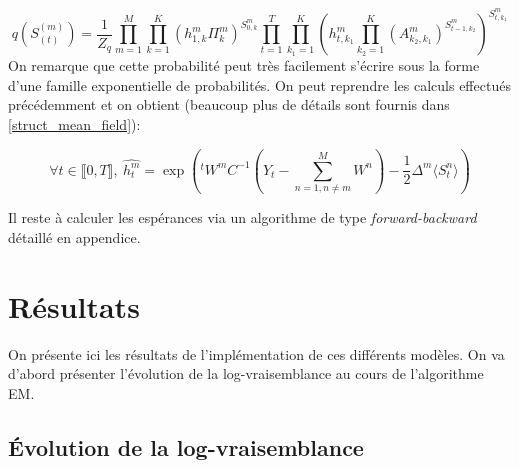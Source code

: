 \documentclass[10pt,a4paper]{article}
\newcommand{\EM}{\textsc{EM}}
\begin{document}
\begin{equation}
  q(S_{(t)}^{(m)}) = \frac{1}{Z_q} \underset{m=1}{\overset{M}{\prod}} 
  \underset{k=1}{\overset{K}{\prod}} \left( h_{1,k}^m \Pi_k^m \right)^{S_{0,k}^m} 
  \underset{t=1}{\overset{T}{\prod}} \underset{k_1=1}{\overset{K}{\prod}} 
  \left(h_{t,k_1}^m \underset{k_2=1}{\overset{K}{\prod}} \left( 
  A_{k_2,k_1}^m\right)^{S_{t-1,k_2}^m} \right)^{S_{t,k_1}^m}
\end{equation}
On remarque que cette probabilité peut très facilement s'écrire sous la forme 
d'une famille exponentielle de probabilités.
On peut reprendre les calculs effectués précédemment et on obtient (beaucoup plus de détails sont fournis dans \ref{struct_mean_field}):

\begin{equation}
\forall t \in \llbracket 0,T \rrbracket, \ \hat{h_t^m} = \exp \left( 
{}^tW^mC^{-1} \left( Y_t - \underset{n=1, n \neq m}{\overset{M}{\sum}} W^n 
\right) -\frac{1}{2} \Delta^m \langle S_t^n \rangle \right)
\end{equation}

Il reste à calculer les espérances via un algorithme de type \textit{forward-backward} détaillé en appendice.
\section{Résultats}
\label{sec:results}

On présente ici les résultats de l'implémentation de ces différents modèles.  
On va d'abord présenter l'évolution de la log-vraisemblance au cours de 
l'algorithme \EM.
\subsection{Évolution de la log-vraisemblance}
\end{document}
